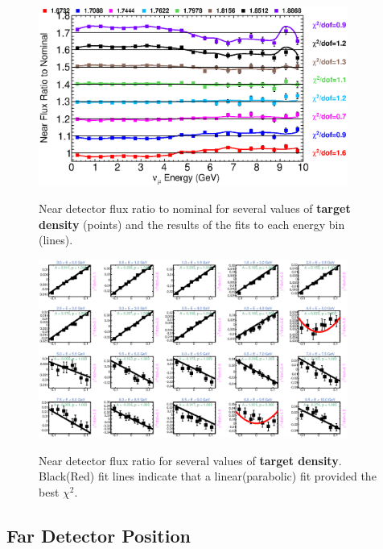 \begin{figure}[ht]
  \begin{center}
    {\includegraphics[width=4.0in]{figures/Density__near_summary.eps}}
  \end{center}
\caption{ Near detector flux ratio to nominal for several values of {\bf target density} (points) and the results of the fits to each energy bin (lines).}
\end{figure}

\begin{figure}[hb]
  \begin{center}
    {\includegraphics[width=4.0in]{figures/Density__near_fits.eps}}
  \end{center}
\caption{ Near detector flux ratio for several values of {\bf target density}. Black(Red) fit lines indicate that a linear(parabolic) fit provided the best $\chi^2$. }
\end{figure}

\clearpage
\subsection{Far Detector Position}

